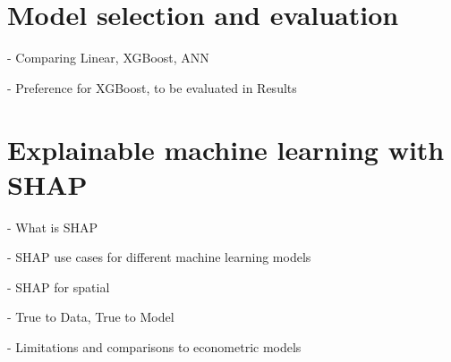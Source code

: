 \pagebreak %
\section{Model selection and evaluation}
- Comparing Linear, XGBoost, ANN

- Preference for XGBoost, to be evaluated in Results
\section{Explainable machine learning with SHAP}
 - What is SHAP 
 
 - SHAP use cases for different machine learning models

 - SHAP for spatial

 - True to Data, True to Model

 - Limitations and comparisons to econometric models
